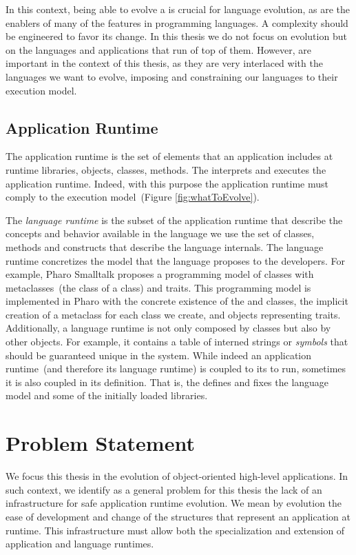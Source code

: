 In this context, being able to evolve a \VM is crucial for language evolution, as \VMs are the enablers of many of the features in programming languages. A \VM complexity should be engineered to favor its change. In this thesis we do not focus on \VM evolution but on the languages and applications that run of top of them. However, \VMs are important in the context of this thesis, as they are very interlaced with the languages we want to evolve, imposing and constraining our languages to their execution model.

\subsection{Application Runtime}

The application runtime is the set of elements that an application includes at runtime \eg libraries, objects, classes, methods. The \VM interprets and executes the application runtime. Indeed, with this purpose the application runtime must comply to the \VM execution model~(Figure \ref{fig:whatToEvolve}).

The \emph{language runtime} is the subset of the application runtime that describe the concepts and behavior available in the language we use \ie the set of classes, methods and constructs that describe the language internals. The language runtime concretizes the model that the language proposes to the developers. For example, Pharo Smalltalk proposes a programming model of classes with metaclasses~(the class of a class) and traits. This programming model is implemented in Pharo with the concrete existence of the  and  classes, the implicit creation of a metaclass for each class we create, and objects representing traits. Additionally, a language runtime is not only composed by classes but also by other objects. For example, it contains a table of interned strings or \emph{symbols} that should be guaranteed unique in the system.
While indeed an application runtime~(and therefore its language runtime) is coupled to its \VM to run, sometimes it is also coupled in its definition. That is, the \VM defines and fixes the language model and some of the initially loaded libraries.

\section{Problem Statement}

We focus this thesis in the evolution of object-oriented high-level applications. In such context, we identify as a general problem for this thesis the lack of an infrastructure for safe application runtime evolution. We mean by evolution the ease of development and change of the structures that represent an application at runtime. This infrastructure must allow both the specialization and extension of application and language runtimes.

